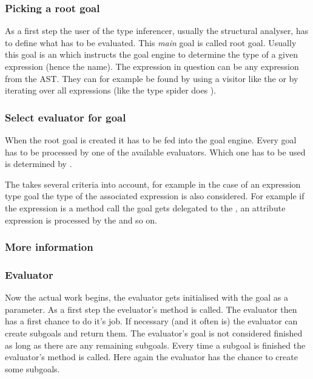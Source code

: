 \documentclass[12pt,halfparskip,DIV11,BCOR10mm]{scrreprt}
\begin{document}
\subsubsection{Picking a root goal}

As a first step the user of the type inferencer, usually the structural analyser, has to define what has to be evaluated. This \emph{main} goal is called root goal. Usually this goal is an  which instructs the goal engine to determine the type of a given expression (hence the name). The expression in question can be any expression from the AST. They can for example be found by using a visitor like the  or by iterating over all expressions (like the type spider does ).

\subsubsection{Select evaluator for goal}

When the root goal is created it has to be fed into the goal engine. Every goal has to be processed by one of the available evaluators. Which one has to be used is determined by .

The  takes several criteria into account, for example in the case of an expression type goal the type of the associated expression is also considered. For example if the expression is a method call the goal gets delegated to the , an attribute expression is processed by the  and so on.

\subsubsection{More information}

\subsubsection{Evaluator}

Now the actual work begins, the evaluator gets initialised with the goal as a parameter. As a first step the eveluator's  method is called. The evaluator then has a first chance to do it's job. If necessary (and it often is) the evaluator can create subgoals and return them. The evaluator's goal is not considered finished as long as there are any remaining subgoals. Every time a subgoal is finished the evaluator's  method is called. Here again the evaluator has the chance to create some subgoals.
\end{document}
